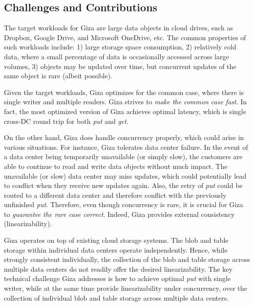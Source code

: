 \subsection{Challenges and Contributions}

The target workloads for Giza are large data objects in cloud drives, such as
Dropbox, Google Drive, and Microsoft OneDrive, etc. The common properties of
such workloads include: 1) large storage space consumption, 2) relatively cold
data, where a small percentage of data is occasionally accessed across large
volumes, 3) objects may be updated over time, but concurrent updates of the same
object is rare (albeit possible).

Given the target workloads, Giza optimizes for the common case, where there is
single writer and multiple readers. Giza strives to {\em make the common case
  fast}. In fact, the most optimized version of Giza achieves optimal latency,
which is single cross-DC round trip for both {\em put} and {\em get}.

On the other hand, Giza does handle concurrency properly, which could arise in
various situations. For instance, Giza tolerates data center failure. In the
event of a data center being temporarily unavailable (or simply slow), the
customers are able to continue to read and write data objects without much
impact. The unavailable (or slow) data center may miss updates, which could
potentially lead to conflict when they receive new updates again. Also, the
retry of {\em put} could be routed to a different data center and therefore
conflict with the previously unfinished {\em put}. Therefore, even though
concurrency is rare, it is crucial for Giza to {\em guarantee the rare case
  correct}. Indeed, Giza provides external consistency (linearizability).

Giza operates on top of existing cloud storage systems. 
The blob and table storage within individual data centers operate independently.
Hence, while strongly consistent individually, the collection of the blob and
table storage across multiple data centers do not readily offer the desired
linearizability. The key technical challenge Giza addresses is how to achieve
optimal {\em put} with single writer, while at the same time provide
linearizability under concurrency, over the collection of individual blob and
table storage across multiple data centers.

